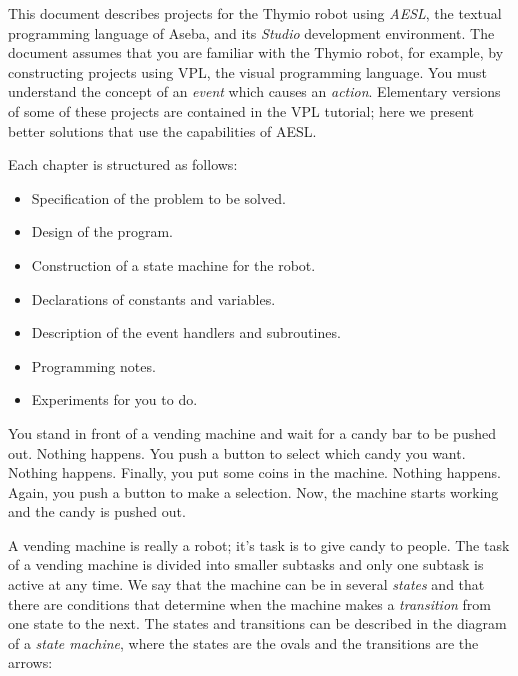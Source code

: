
\label{ch.intro}

This document describes projects for the Thymio robot using \emph{AESL},
the textual programming language of Aseba, and its \emph{Studio}
development environment. The document assumes that you are familiar with
the Thymio robot, for example, by constructing projects using VPL, the
visual programming language. You must understand the concept of an
\emph{event} which causes an \emph{action}. Elementary versions of some
of these projects are contained in the VPL tutorial; here we present
better solutions that use the capabilities of AESL.


Each chapter is structured as follows:

\begin{itemize}
\item Specification of the problem to be solved.
\item Design of the program.
\item Construction of a state machine for the robot.
\item Declarations of constants and variables.
\item Description of the event handlers and subroutines.
\item Programming notes.
\item Experiments for you to do.
\end{itemize}


\newpage


You stand in front of a vending machine and wait for a candy bar to be
pushed out. Nothing happens. You push a button to select which candy you
want. Nothing happens. Finally, you put some coins in the machine.
Nothing happens. Again, you push a button to make a selection. Now, the
machine starts working and the candy is pushed out.

A vending machine is really a robot; it's task is to give candy to
people. The task of a vending machine is divided into
smaller subtasks and only one subtask is active at any time. We say that
the machine can be in several \emph{states} and that there are
conditions that determine when the machine makes a \emph{transition}
from one state to the next. The states and transitions can be described
in the diagram of a \emph{state machine}, where the states are the ovals
and the transitions are the arrows:

